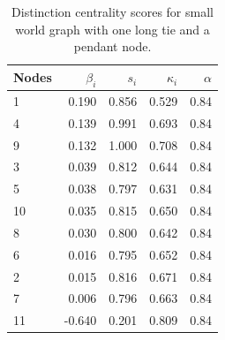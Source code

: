 \begin{table}
\centering
\caption{\label{tab:rege1}Distinction centrality scores for small world graph with one long tie and a pendant node.}
\centering
\begin{tabular}[t]{lrrrr}
\toprule
Nodes & $\beta_i$ & $s_i$ & $\kappa_i$ & $\alpha$\\
\midrule
1 & 0.190 & 0.856 & 0.529 & 0.84\\
4 & 0.139 & 0.991 & 0.693 & 0.84\\
9 & 0.132 & 1.000 & 0.708 & 0.84\\
3 & 0.039 & 0.812 & 0.644 & 0.84\\
5 & 0.038 & 0.797 & 0.631 & 0.84\\
10 & 0.035 & 0.815 & 0.650 & 0.84\\
8 & 0.030 & 0.800 & 0.642 & 0.84\\
6 & 0.016 & 0.795 & 0.652 & 0.84\\
2 & 0.015 & 0.816 & 0.671 & 0.84\\
7 & 0.006 & 0.796 & 0.663 & 0.84\\
11 & -0.640 & 0.201 & 0.809 & 0.84\\
\bottomrule
\end{tabular}
\end{table}
